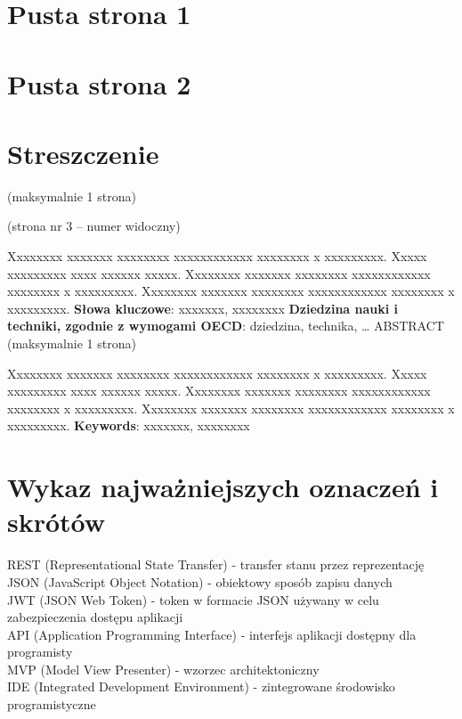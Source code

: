 \documentclass[10pt,twoside,a4paper]{report}
\begin{document}
\chapter*{Pusta strona 1}
\chapter*{Pusta strona 2}
\renewcommand{\familydefault}{\sfdefault}
\chapter*{Streszczenie}
(maksymalnie 1 strona)\par
(strona nr 3 – numer widoczny)\par
Xxxxxxxx xxxxxxx xxxxxxxx xxxxxxxxxxxx xxxxxxxx x xxxxxxxxx. Xxxxx xxxxxxxxx xxxx xxxxxx xxxxx. Xxxxxxxx xxxxxxx xxxxxxxx xxxxxxxxxxxx xxxxxxxx x xxxxxxxxx. Xxxxxxxx xxxxxxx xxxxxxxx xxxxxxxxxxxx xxxxxxxx x xxxxxxxxx. 
\newline\textbf{Słowa kluczowe}: xxxxxxx, xxxxxxxx
\newline\textbf{Dziedzina nauki i techniki, zgodnie z wymogami OECD}: 
dziedzina, technika, …
\newline ABSTRACT (maksymalnie 1 strona)
\par Xxxxxxxx xxxxxxx xxxxxxxx xxxxxxxxxxxx xxxxxxxx x xxxxxxxxx. Xxxxx xxxxxxxxx xxxx xxxxxx xxxxx. Xxxxxxxx xxxxxxx xxxxxxxx xxxxxxxxxxxx xxxxxxxx x xxxxxxxxx. Xxxxxxxx xxxxxxx xxxxxxxx xxxxxxxxxxxx xxxxxxxx x xxxxxxxxx.
\newline\textbf{Keywords}: xxxxxxx, xxxxxxxx

\tableofcontents
\chapter*{Wykaz najważniejszych oznaczeń i skrótów}
\noindent REST (Representational State Transfer) - transfer stanu przez reprezentację \\
JSON (JavaScript Object Notation) - obiektowy sposób zapisu danych \\
JWT (JSON Web Token) - token w formacie JSON używany w celu zabezpieczenia dostępu aplikacji \\
API (Application Programming Interface) - interfejs aplikacji dostępny dla programisty \\
MVP (Model View Presenter) - wzorzec architektoniczny\\
IDE (Integrated Development Environment) - zintegrowane środowisko programistyczne\\
\end{document}
